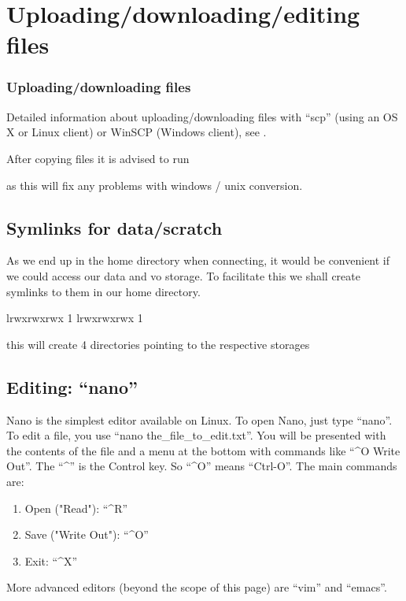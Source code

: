 \chapter{Uploading/downloading/editing files}

\subsection{Uploading/downloading files}

Detailed information about uploading/downloading files with ``scp'' (using an OS
X or Linux client) or WinSCP (Windows client), see
.

After copying files it is advised to run 

\begin{prompt}
\end{prompt}

as this will fix any problems with windows / unix conversion.

\section{Symlinks for data/scratch}

As we end up in the home directory when connecting, it would be convenient if we
could access our data and vo storage. To facilitate this we shall create
symlinks to them in our home directory.

\begin{prompt}
lrwxrwxrwx 1 %
lrwxrwxrwx 1 %
\end{prompt}

this will create 4 directories pointing to the respective storages

\section{Editing: ``nano''}

Nano is the simplest editor available on Linux. To open Nano, just type
``nano''. To edit a file, you use ``nano the\_file\_to\_edit.txt''. You will
be presented with the contents of the file and a menu at the bottom with
commands like ``\^{}O Write Out''. The ``\^{}'' is the Control key. So ``\^{}O'' means
``Ctrl-O''. The main commands are:

\begin{enumerate}
\item Open ("Read"): ``\^{}R''
\item Save ("Write Out"): ``\^{}O''
\item Exit: ``\^{}X''
\end{enumerate}

More advanced editors (beyond the scope of this page) are ``vim'' and ``emacs''.



